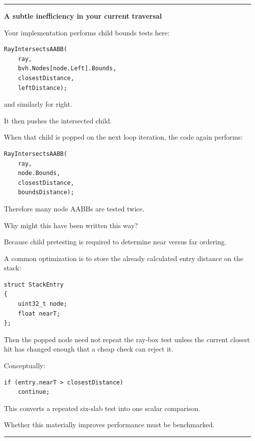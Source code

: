 \begin{center}\rule{0.5\linewidth}{0.5pt}\end{center}

\textbf{A subtle inefficiency in your current traversal}

Your implementation performs child bounds tests here:

\begin{verbatim}
RayIntersectsAABB(
    ray,
    bvh.Nodes[node.Left].Bounds,
    closestDistance,
    leftDistance);
\end{verbatim}

and similarly for right.

It then pushes the intersected child.

When that child is popped on the next loop iteration, the code again performs:

\begin{verbatim}
RayIntersectsAABB(
    ray,
    node.Bounds,
    closestDistance,
    boundsDistance);
\end{verbatim}

Therefore many node AABBs are tested twice.

Why might this have been written this way?

Because child pretesting is required to determine near versus far ordering.

A common optimization is to store the already calculated entry distance on the stack:

\begin{verbatim}
struct StackEntry
{
    uint32_t node;
    float nearT;
};
\end{verbatim}

Then the popped node need not repeat the ray-box test unless the current closest hit has changed enough that a cheap  check can reject it.

Conceptually:

\begin{verbatim}
if (entry.nearT > closestDistance)
    continue;
\end{verbatim}

This converts a repeated six-slab test into one scalar comparison.

Whether this materially improves performance must be benchmarked.

\begin{center}\rule{0.5\linewidth}{0.5pt}\end{center}

